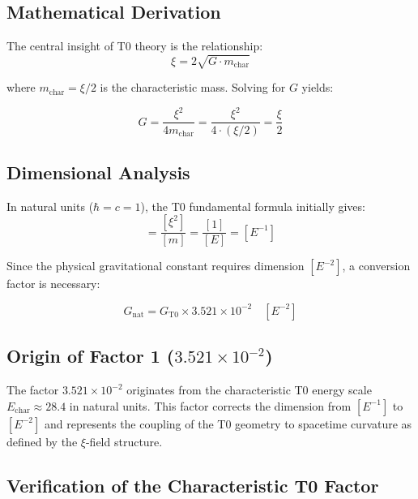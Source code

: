 	\subsection{Mathematical Derivation}
	
	The central insight of T0 theory is the relationship:
	\begin{equation}
		\xi = 2\sqrt{G \cdot m_{\text{char}}}
	\end{equation}
	
	where $m_{\text{char}} = \xi/2$ is the characteristic mass. Solving for $G$ yields:
	
	\begin{equation}
		\boxed{G = \frac{\xi^2}{4m_{\text{char}}} = \frac{\xi^2}{4 \cdot (\xi/2)} = \frac{\xi}{2}}
	\end{equation}
	
	\subsection{Dimensional Analysis}
	
	In natural units ($\hbar = c = 1$), the T0 fundamental formula initially gives:
	\begin{equation}
		[G_{\text{T0}}] = \frac{[\xi^2]}{[m]} = \frac{[1]}{[E]} = [E^{-1}]
	\end{equation}
	
	Since the physical gravitational constant requires dimension $[E^{-2}]$, a conversion factor is necessary:
	
	\begin{equation}
		G_{\text{nat}} = G_{\text{T0}} \times 3.521 \times 10^{-2} \quad [E^{-2}]
	\end{equation}
	
	\subsection{Origin of Factor 1 ($3.521 \times 10^{-2}$)}
	
	The factor $3.521 \times 10^{-2}$ originates from the characteristic T0 energy scale $E_{\text{char}} \approx 28.4$ in natural units. This factor corrects the dimension from $[E^{-1}]$ to $[E^{-2}]$ and represents the coupling of the T0 geometry to spacetime curvature as defined by the $\xi$-field structure.
	
	\subsection{Verification of the Characteristic T0 Factor}
	

